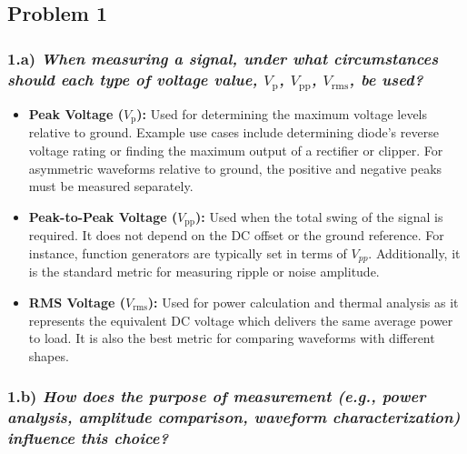



\renewcommand{\LabNumber}{1}


\subsection*{Problem 1}
\subsubsection*{1.a) \normalfont\itshape When measuring a signal, under what circumstances should each type of voltage value, $V_\mathrm{p}$, $V_{\mathrm{pp}}$, $V_{\mathrm{rms}}$, be used?}

\begin{itemize}
    \item \textbf{Peak Voltage ($V_\mathrm{p}$):} Used for determining the maximum voltage levels relative to ground. Example use cases include determining diode's reverse voltage rating or finding the maximum output of a rectifier or clipper.
                                                  For asymmetric waveforms relative to ground, the positive and negative peaks must be measured separately.
    \item \textbf{Peak-to-Peak Voltage ($V_\mathrm{pp}$):} Used when the total swing of the signal is required. It does not depend on the DC offset or the ground reference. For instance, function generators are typically set in terms of $V_{pp}$. 
                                                           Additionally, it is the standard metric for measuring ripple or noise amplitude.
    \item \textbf{RMS Voltage ($V_\mathrm{rms}$):} Used for power calculation and thermal analysis as it represents the equivalent DC voltage which delivers the same average power to load. It is also the best metric for comparing waveforms with different shapes.
\end{itemize}

\subsubsection*{1.b) \normalfont\itshape How does the purpose of measurement (e.g., power analysis, amplitude comparison, waveform characterization) influence this choice?}

